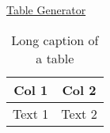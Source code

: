 \documentclass{uc-mse}
\begin{document}
\listoftables
\href{https://www.tablesgenerator.com/#}{Table Generator}

    \begin{table}[]
        \begin{tabular}{cc}
            \textbf{Col 1} & \textbf{Col 2} \\ \hline
                Text 1         & Text 2        
        \end{tabular}
        \caption[Short caption of a table]{Long caption of a table} 
    \end{table}
    
\end{document}
